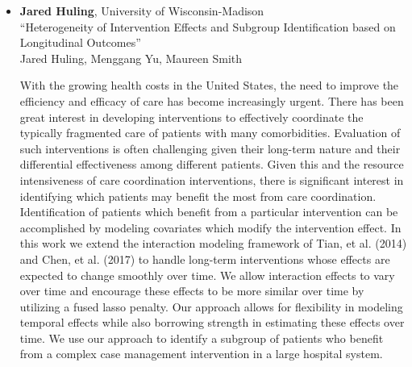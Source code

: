 \begin{itemize}
\item \textbf{Jared Huling}, University of Wisconsin-Madison \\
``Heterogeneity of Intervention Effects and Subgroup Identification based on Longitudinal Outcomes'' \\
Jared Huling, Menggang Yu, Maureen Smith


With the growing health costs in the United States, the need to improve the efficiency and efficacy
of care has become increasingly urgent. There has been great interest in developing interventions to
effectively coordinate the typically fragmented care of  patients with many comorbidities. Evaluation
of such interventions is often challenging given their long-term nature and their differential effectiveness among different patients. Given this and the resource intensiveness of care coordination interventions, there is significant interest in identifying which patients may benefit the most from care coordination. Identification of patients which benefit from a particular intervention can be accomplished by modeling covariates which modify the intervention effect. In this work we extend the interaction modeling framework of Tian, et al. (2014) and Chen, et al. (2017) to handle long-term interventions whose effects are expected to change smoothly over time. We  allow interaction effects to vary over time and encourage these effects to be more similar over time by utilizing a fused lasso penalty. Our approach allows for flexibility in modeling temporal effects while also borrowing strength in estimating these effects over time. We use our approach to identify a subgroup of patients who benefit from a complex case management intervention in a large hospital system.

\end{itemize}

